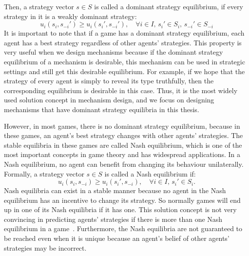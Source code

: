 \documentclass[11pt]{phdthesis}
\begin{document}
Then, a strategy vector $ s \in S $ is called a dominant strategy equilibrium, if every strategy in it is a weakly dominant strategy:
\[u_i(s_i,s_{-i}') \geq u_i(s_i',s_{-i}'),\quad \forall  i \in I ,\, s_i' \in S_i,\, s_{-i}' \in S_{-i}\] 
It is important to note that if a game has a dominant strategy equilibrium, each agent has a best strategy regardless of other agents' strategies. This property is very useful when we design mechanisms because if the dominant strategy equilibrium of a mechanism is desirable, this mechanism can be used in strategic settings and still get this desirable equilibrium. For example, if we hope that the strategy of every agent is simply to reveal its type truthfully, then the corresponding equilibrium is desirable in this case. Thus, it is the most widely used solution concept in mechanism design, and we focus on designing mechanisms that have dominant strategy equilibria in this thesis. 

%
However, in most games, there is no dominant strategy equilibrium, because in these games, an agent's best strategy changes with other agents' strategies. The stable equilibria in these games are called Nash equilibrium, which is one of the most important concepts in game theory and has widespread applications. In a Nash equilibrium, no agent can benefit from changing its behaviour unilaterally. Formally, a strategy vector $ s\in S $ is called a Nash equilibrium if:
\[u_i(s_i,s_{-i}) \geq u_i(s_i',s_{-i}),\quad \forall  i \in I ,\,  s_i' \in S_i.\] 
Nash equilibria can exist in a stable manner because no agent in the Nash equilibrium has an incentive to change its strategy. So normally games will end up in one of its Nash equilibria if it has one. This solution concept is not very convincing in predicting agents' strategies if there is more than one Nash equilibrium in a game~\citep{nisan2007algorithmic}. Furthermore, the Nash equilibria are not guaranteed to be reached even when it is unique because an agent's belief of other agents' strategies may be incorrect. 

\end{document}
